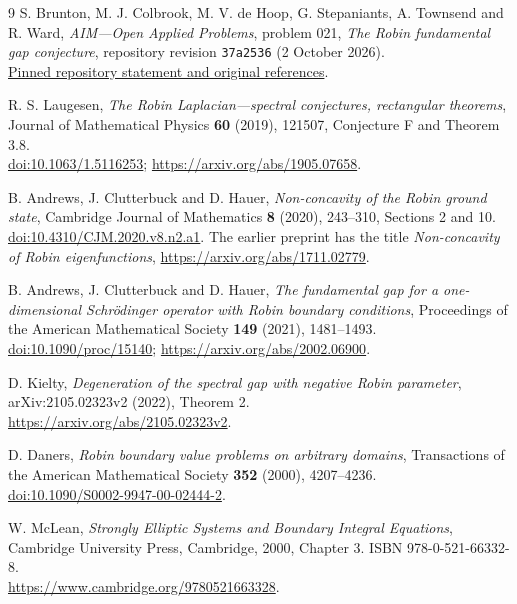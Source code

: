 \documentclass[11pt,a4paper]{article}
\theoremstyle{remark}
\begin{document}
\begingroup\raggedright
\begin{thebibliography}{9}
S. Brunton, M. J. Colbrook, M. V. de Hoop, G. Stepaniants, A. Townsend and R. Ward,
\emph{AIM---Open Applied Problems}, problem 021, \emph{The Robin fundamental gap conjecture},
repository revision \texttt{37a2536} (2 October 2026).\\
\href{https://github.com/MColbrook/AIM/blob/37a25361f243be77daea0ae0b3c5167b57f1b5f3/problems/021-robin-fundamental-gap.md}{Pinned repository statement and original references}.

R. S. Laugesen, \emph{The Robin Laplacian---spectral conjectures, rectangular theorems},
Journal of Mathematical Physics \textbf{60} (2019), 121507, Conjecture F and Theorem 3.8.\\
\href{https://doi.org/10.1063/1.5116253}{doi:10.1063/1.5116253}; \url{https://arxiv.org/abs/1905.07658}.

B. Andrews, J. Clutterbuck and D. Hauer, \emph{Non-concavity of the Robin ground state},
Cambridge Journal of Mathematics \textbf{8} (2020), 243--310, Sections 2 and 10.\\
\href{https://doi.org/10.4310/CJM.2020.v8.n2.a1}{doi:10.4310/CJM.2020.v8.n2.a1}.
The earlier preprint has the title \emph{Non-concavity of Robin eigenfunctions},
\url{https://arxiv.org/abs/1711.02779}.

B. Andrews, J. Clutterbuck and D. Hauer, \emph{The fundamental gap for a one-dimensional
Schr\"odinger operator with Robin boundary conditions}, Proceedings of the American
Mathematical Society \textbf{149} (2021), 1481--1493.\\
\href{https://doi.org/10.1090/proc/15140}{doi:10.1090/proc/15140}; \url{https://arxiv.org/abs/2002.06900}.

D. Kielty, \emph{Degeneration of the spectral gap with negative Robin parameter},
arXiv:2105.02323v2 (2022), Theorem 2.\\
\url{https://arxiv.org/abs/2105.02323v2}.

D. Daners, \emph{Robin boundary value problems on arbitrary domains},
Transactions of the American Mathematical Society \textbf{352} (2000), 4207--4236.\\
\href{https://doi.org/10.1090/S0002-9947-00-02444-2}{doi:10.1090/S0002-9947-00-02444-2}.

W. McLean, \emph{Strongly Elliptic Systems and Boundary Integral Equations},
Cambridge University Press, Cambridge, 2000, Chapter 3. ISBN 978-0-521-66332-8.\\
\url{https://www.cambridge.org/9780521663328}.
\end{thebibliography}
\endgroup
\end{document}
